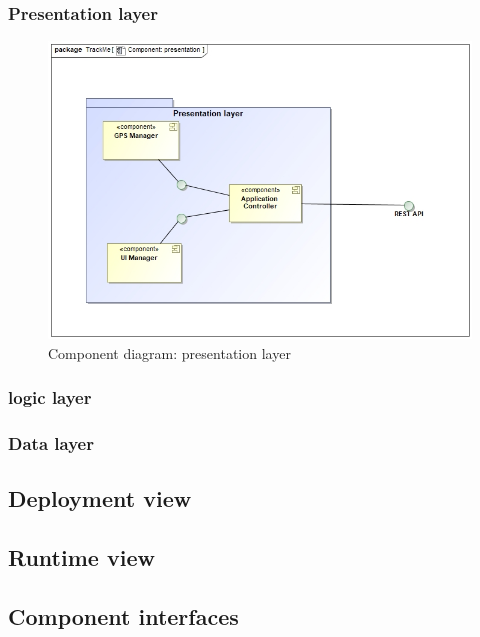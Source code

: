 \documentclass[a4paper]{article}
\begin{document}
\subsubsection{Presentation layer}
 
    
    \begin{figure}[!htpb]
        \centering
        \includegraphics[width=\textwidth]{DD/images/CP.jpg}
        \caption{Component diagram: presentation layer}
    \end{figure}
    
    \newpage

\subsubsection{logic layer}

\newpage

\subsubsection{Data layer}

\newpage

\subsection{Deployment view}


\newpage


\subsection{Runtime view}

\newpage

\subsection{Component interfaces}
\end{document}
